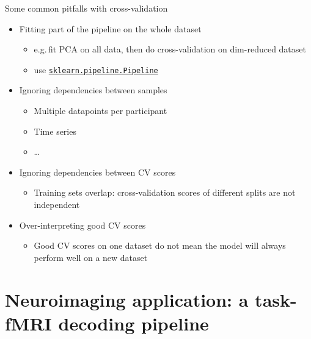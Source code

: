 \documentclass[presentation,mathserif,table]{beamer}
\newcommand{\eg}{e.g.\,}
\begin{document}
\begin{frame}[label={sec:orgb47380a},fragile]{Some common pitfalls with cross-validation}
 \begin{itemize}
\item Fitting part of the pipeline on the whole dataset
\begin{itemize}
\item \eg fit PCA on all data, then do cross-validation on dim-reduced dataset
\item use  \href{https://scikit-learn.org/stable/modules/generated/sklearn.pipeline.Pipeline.html}{\texttt{sklearn.pipeline.Pipeline}}
\end{itemize}
\item Ignoring dependencies between samples
\begin{itemize}
\item Multiple datapoints per participant
\item Time series
\item \ldots{}
\end{itemize}
\item Ignoring dependencies between CV scores
\begin{itemize}
\item Training sets overlap: cross-validation scores of different splits are not independent
\end{itemize}
\item Over-interpreting good CV scores
\begin{itemize}
\item Good CV scores on one dataset do not mean the model will always perform well on a new dataset
\end{itemize}
\end{itemize}
\end{frame}

\section{Neuroimaging application: a task-fMRI decoding pipeline}
\label{sec:org59876a1}
\end{document}
